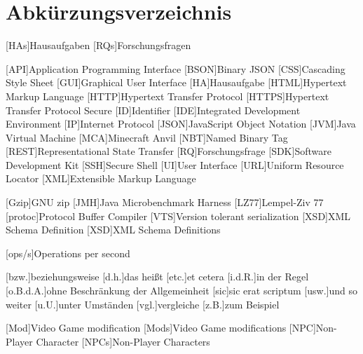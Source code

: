 \chapter*{Abkürzungsverzeichnis}


[HAs]{Hausaufgaben}
[RQs]{Forschungsfragen}

\begin{acronym}[XXXXXX] %
    [API]{Application Programming Interface}
    [BSON]{Binary JSON}
    [CSS]{Cascading Style Sheet}
    [GUI]{Graphical User Interface}
    [HA]{Hausaufgabe}
    [HTML]{Hypertext Markup Language}
    [HTTP]{Hypertext Transfer Protocol}
    [HTTPS]{Hypertext Transfer Protocol Secure}
    [ID]{Identifier}
    [IDE]{Integrated Development Environment}
    [IP]{Internet Protocol}
    [JSON]{JavaScript Object Notation}
    [JVM]{Java Virtual Machine}
    [MCA]{Minecraft Anvil}
    [NBT]{Named Binary Tag}
    [REST]{Representational State Transfer}
    [RQ]{Forschungsfrage}
    [SDK]{Software Development Kit}
    [SSH]{Secure Shell}
    [UI]{User Interface}
    [URL]{Uniform Resource Locator}
    [XML]{Extensible Markup Language}
    
    \vspace{\parskip}
    
    [Gzip]{GNU zip}
    [JMH]{Java Microbenchmark Harness}
    [LZ77]{Lempel-Ziv 77}
    [protoc]{Protocol Buffer Compiler}
    [VTS]{Version tolerant serialization}
    [XSD]{XML Schema Definition}
    [XSD]{XML Schema Definitions}
    
    \vspace{\parskip}

    [ops/s]{Operations per second}

    \vspace{\parskip}

    [bzw.]{beziehungsweise}
    [d.h.]{das heißt}
    [etc.]{et cetera}
    [i.d.R.]{in der Regel}
    [o.B.d.A.]{ohne Beschränkung der Allgemeinheit}
    [sic]{sic erat scriptum}
    [usw.]{und so weiter}
    [u.U.]{unter Umständen}
    [vgl.]{vergleiche}
    [z.B.]{zum Beispiel}

    \vspace{\parskip}

    [Mod]{Video Game modification}
    [Mods]{Video Game modifications}
    [NPC]{Non-Player Character}
    [NPCs]{Non-Player Characters}
\end{acronym}
